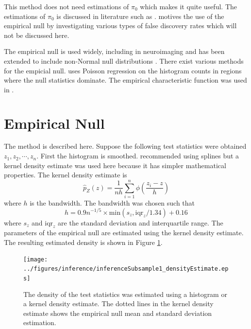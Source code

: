 This method does not need estimations of $\pi_0$ which makes it quite useful. The estimations of $\pi_0$ is discussed in literature such as \cite{benjamini2000adaptive, pounds2003estimating, storey2003statistical, pounds2004improving, langaas2005estimating, durnez2014posthoc}. \cite{efron2004large} motives the use of the empirical null by investigating various types of false discovery rates \citep{storey2002direct, storey2003positive, efron2002empirical, efron2007size} which will not be discussed here.

The empirical null is used widely, including in neuroimaging \citep{schwartzman2008false, schwartzman2009empirical} and has been extended to include non-Normal null distributions \citep{schwartzman2008false, schwartzman2008empirical}. There exist various methods for the empicial null. \citep{schwartzman2008empirical} uses Poisson regression on the histogram counts in regions where the null statistics dominate. The empirical characteristic function was used in \citep{jin2007estimating}.

\section{Empirical Null}

The method is described here. Suppose the following test statistics were obtained $z_1,z_2,\cdots,z_n$. First the histogram is smoothed. \cite{efron2004large} recommended using splines but a kernel density estimate \citep{parzen1962on, friedman2001elements} was used here because it has simpler mathematical properties. The kernel density estimate \citep{parzen1962on} is
\begin{equation}
  \widehat{p}_Z(z)=
  \frac{1}{nh}
  \sum_{i=1}^n\phi\left(
    \dfrac{z_i-z}{h}
  \right)
  \label{eq:inference_kernel_density_estimate}
\end{equation}
where $h$ is the bandwidth. The bandwidth was chosen such that
\begin{equation}
  h = 0.9n^{-1/5}\times\text{min}\left(s_z,\text{iqr}_z/1.34\right) + 0.16
  \label{eq:inference_ourruleofthumb}
\end{equation}
where $s_z$ and $\text{iqr}_z$ are the standard deviation and interquartile range. The parameters of the empirical null are estimated using the kernel density estimate. The resulting estimated density is shown in Figure \ref{fig:inference_empirical_null_sub_density_estimate}.

\begin{figure}
  \centering
  \texttt{[image: ../figures/inference/inferenceSubsample1\_densityEstimate.eps]}
  \caption{The density of the test statistics was estimated using a histogram or a kernel density estimate. The dotted lines in the kernel density estimate shows the empirical null mean and standard deviation estimation.}
  \label{fig:inference_empirical_null_sub_density_estimate}
\end{figure}

